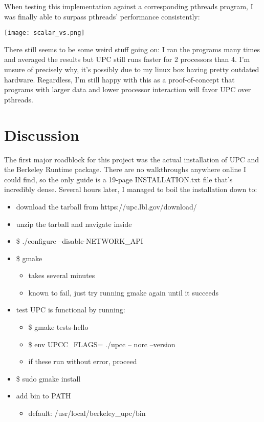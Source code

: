 \documentclass{article}
\begin{document}
When testing this implementation against a corresponding pthreads program, I was finally able to surpass pthreads' performance consistently:

\begin{center}
    \texttt{[image: scalar\_vs.png]}
\end{center}

There still seems to be some weird stuff going on: I ran the programs many times and averaged the results but UPC still runs faster for 2 processors than 4. I'm unsure of precisely why, it's possibly due to my linux box having pretty outdated hardware. Regardless, I'm still happy with this as a proof-of-concept that programs with larger data and lower processor interaction will favor UPC over pthreads.

\section{Discussion}

The first major roadblock for this project was the actual installation of UPC and the Berkeley Runtime package. There are no walkthroughs anywhere online I could find, so the only guide is a 19-page INSTALLATION.txt file that's incredibly dense. Several hours later, I managed to boil the installation down to:

\begin{itemize}
    \item download the tarball from https://upc.lbl.gov/download/
    \item unzip the tarball and navigate inside
    \item \$ ./configure --disable-NETWORK\_API
    \item \$ gmake
        \begin{itemize}
            \item takes several minutes
            \item known to fail, just try running gmake again until it succeeds
        \end{itemize}
    \item test UPC is functional by running: 
    \begin{itemize}
        \item \$ gmake tests-hello
        \item \$ env UPCC\_FLAGS= ./upcc -- norc --version
        \item if these run without error, proceed
    \end{itemize}
    \item \$ sudo gmake install
    \item add bin to PATH
    \begin{itemize}
        \item default: /usr/local/berkeley\_upc/bin
    \end{itemize}
\end{itemize}
\end{document}

